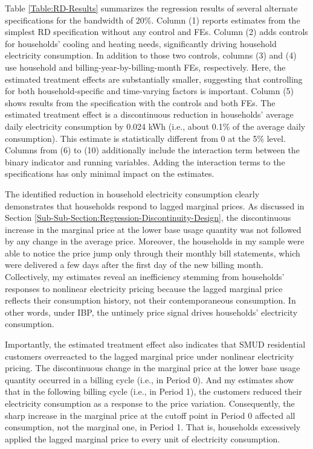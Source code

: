 Table \ref{Table:RD-Results} summarizes the regression results of several alternate specifications for the bandwidth of 20\%. Column (1) reports estimates from the simplest RD specification without any control and FEs. Column (2) adds controls for households' cooling and heating needs, significantly driving household electricity consumption. In addition to those two controls, columns (3) and (4) use household and billing-year-by-billing-month FEs, respectively. Here, the estimated treatment effects are substantially smaller, suggesting that controlling for both household-specific and time-varying factors is important. Column (5) shows results from the specification with the controls and both FEs. The estimated treatment effect is a discontinuous reduction in households' average daily electricity consumption by 0.024 kWh (i.e., about 0.1\% of the average daily consumption). This estimate is statistically different from 0 at the 5\% level. Columns from (6) to (10) additionally include the interaction term between the binary indicator and running variables. Adding the interaction terms to the specifications has only minimal impact on the estimates.  

The identified reduction in household electricity consumption clearly demonstrates that households respond to lagged marginal prices. As discussed in Section \ref{Sub-Sub-Section:Regression-Discontinuity-Design}, the discontinuous increase in the marginal price at the lower base usage quantity was not followed by any change in the average price. Moreover, the households in my sample were able to notice the price jump only through their monthly bill statements, which were delivered a few days after the first day of the new billing month. Collectively, my estimates reveal an inefficiency stemming from households' responses to nonlinear electricity pricing because the lagged marginal price reflects their consumption history, not their contemporaneous consumption. In other words, under IBP, the untimely price signal drives households' electricity consumption. 

Importantly, the estimated treatment effect also indicates that SMUD residential customers overreacted to the lagged marginal price under nonlinear electricity pricing. The discontinuous change in the marginal price at the lower base usage quantity occurred in a billing cycle (i.e., in Period 0). And my estimates show that in the following billing cycle (i.e., in Period 1), the customers reduced their electricity consumption as a response to the price variation. Consequently, the sharp increase in the marginal price at the cutoff point in Period 0 affected all consumption, not the marginal one, in Period 1. That is, households excessively applied the lagged marginal price to every unit of electricity consumption. 

